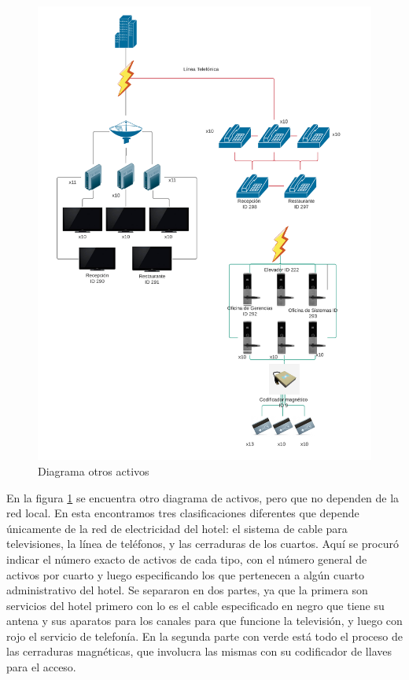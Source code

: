 \documentclass[10pt]{article}
\begin{document}
\begin{figure}[H]
    \centering
\includegraphics[width=\textwidth,height=\textheight,keepaspectratio]{imagenes/Diagrama 2.1.png}
    \caption{Diagrama otros activos}
    \label{fig:otros}
\end{figure}

En la figura \ref{fig:otros} se encuentra otro diagrama de activos, pero que no dependen de la red local. En esta encontramos tres clasificaciones diferentes que depende únicamente de la red de electricidad del hotel: el sistema de cable para televisiones, la línea de teléfonos, y las cerraduras de los cuartos. Aquí se procuró indicar el número exacto de activos de cada tipo, con el número general de activos por cuarto y luego especificando los que pertenecen a algún cuarto administrativo del hotel. Se separaron en dos partes, ya que la primera son servicios del hotel primero con lo es el cable especificado en negro que tiene su antena y sus aparatos para los canales para que funcione la televisión, y luego con rojo el servicio de telefonía. En la segunda parte con verde está todo el proceso de las cerraduras magnéticas, que involucra las mismas con su codificador de llaves para el acceso. 
\end{document}

